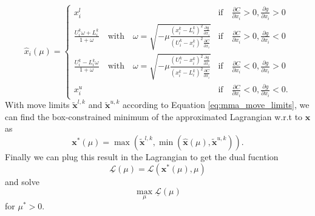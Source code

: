 \begin{equation}
    \hat{x}_i (\mu) = 
    \begin{cases}
        x^l_i 
            &\textrm{if} \quad \frac{\partial C}{\partial x_i} > 0, \frac{\partial g}{\partial x_i} > 0 \\
        \frac{U_i^k\omega + L_i^k}{1+\omega} \quad \text{with} \quad \omega = \sqrt{-\mu\frac{(x_i^k-L_i^k)^2\frac{\partial g}{\partial x_i}}{(U_i^k-x_i^k)^2\frac{\partial C}{\partial x_i}}}
            &\textrm{if} \quad \frac{\partial C}{\partial x_i}  > 0, \frac{\partial g}{\partial x_i} <0\\
        \frac{U_i^k-L_i^k\omega}{1+\omega} \quad \text{with} \quad \omega = \sqrt{-\mu\frac{(U_i^k-x_i^k)^2\frac{\partial g}{\partial x_i}}{(x_i^k-L_i^k)^2\frac{\partial C}{\partial x_i}}} 
            &\textrm{if} \quad \frac{\partial C}{\partial x_i} < 0, \frac{\partial g}{\partial x_i}  > 0\\
        x^u_i 
            &\textrm{if} \quad \frac{\partial C}{\partial x_i}< 0, \frac{\partial g}{\partial x_i} < 0.
    \end{cases}
\end{equation}
With move limits $\tilde{\mathbf{x}}^{l,k}$ and $\tilde{\mathbf{x}}^{u,k}$ according to Equation \eqref{eq:mma_move_limits}, we can find the box-constrained minimum of the approximated Lagrangian w.r.t to $\mathbf{x}$ as
\begin{equation}
    \mathbf{x}^*(\mu) = \max\left(\tilde{\mathbf{x}}^{l,k}, \min \left(\hat{\mathbf{x}}(\mu), \tilde{\mathbf{x}}^{u,k} \right)\right).
\end{equation}
Finally we can plug this result in the Lagrangian to get the dual fucntion 
\begin{equation}
    \underline{\mathcal{L}}(\mu) = \mathcal{L}(\mathbf{x}^* (\mu), \mu)
\end{equation}
and solve 
\begin{equation}
    \max_{\mu} \underline{\mathcal{L}}(\mu)
    \label{eq:shape_dual_solution}
\end{equation}
for $\mu^*>0$. 

